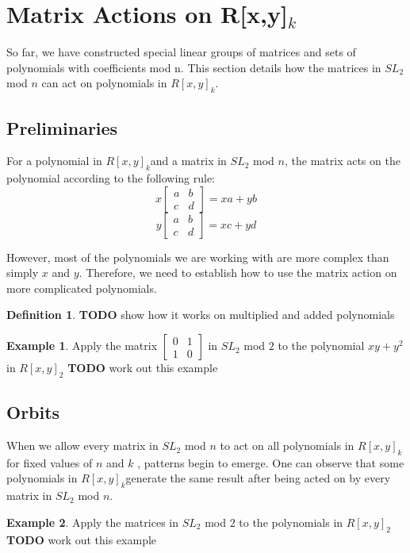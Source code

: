 \documentclass[a4paper,draft]{amsproc}
\theoremstyle{plain}
\theoremstyle{definition}
\newtheorem{exm}{Example}[section]
\newtheorem{dfn}{Definition}[section]
\theoremstyle{remark}
\numberwithin{equation}{section}
\begin{document}
\section{Matrix Actions on R[x,y]$_{k}$} 
So far, we have constructed special linear groups of matrices and sets of polynomials with coefficients mod n. This section details how the matrices in $SL_{2}$ mod $n$ can act on polynomials in $R[x,y]_{k}$. 

\subsection{Preliminaries}
For a polynomial in $R[x,y]_{k}$and a matrix in $SL_{2}$ mod $n$, the matrix acts on the polynomial according to the following rule: 
$$
x\begin{bmatrix}
 a&b \\ 
 c&d 
\end{bmatrix} = xa + yb 
$$
$$
y\begin{bmatrix}
 a&b \\ 
 c&d 
\end{bmatrix} = xc + yd 
$$

However, most of the polynomials we are working with are more complex than simply $x$ and $y$. Therefore, we need to establish how to use the matrix action on more complicated polynomials. 
\begin{dfn}
\textbf{TODO} show how it works on multiplied and added polynomials
\end{dfn}

\begin{exm}
Apply the matrix 
$\begin{bmatrix}
 0&1 \\ 
 1&0 
\end{bmatrix}$ in $SL_{2}$ mod $2$ to the polynomial  $xy + y^{2}$ in $R[x,y]_{2}$ 
\textbf{TODO} work out this example
\end{exm}

\subsection{Orbits}
When we allow every matrix in $SL_{2}$ mod $n$ to act on all polynomials in $R[x,y]_{k}$for fixed values of $n$ and $k$ , patterns begin to emerge.
One can observe that some polynomials in $R[x,y]_{k}$generate the same result after being acted on by every matrix in $SL_{2}$ mod $n$. 
\begin{exm}
Apply the matrices in $SL_{2}$ mod $2$ to the polynomials in $R[x,y]_{2}$ 
\textbf{TODO} work out this example
\end{exm}
\end{document}
